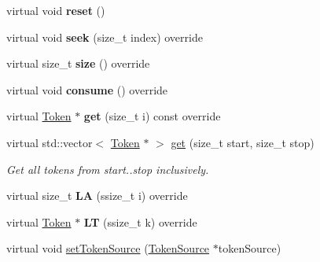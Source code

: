 \begin{DoxyCompactItemize}
virtual void {\bfseries reset} ()
\item 
\mbox{\label{classantlr4_1_1BufferedTokenStream_a96d113899cac110b51147147d9cb7b7a}} 
virtual void {\bfseries seek} (size\+\_\+t index) override
\item 
\mbox{\label{classantlr4_1_1BufferedTokenStream_abacc9f5776ad27c0dde09daea4930952}} 
virtual size\+\_\+t {\bfseries size} () override
\item 
\mbox{\label{classantlr4_1_1BufferedTokenStream_a23f513618817ff1a02f4bd5f8bad57c7}} 
virtual void {\bfseries consume} () override
\item 
\mbox{\label{classantlr4_1_1BufferedTokenStream_a409b9b2413d354d3e675f0e19ca80179}} 
virtual \hyperlink{classantlr4_1_1Token}{Token} $\ast$ {\bfseries get} (size\+\_\+t i) const override
\item 
\mbox{\label{classantlr4_1_1BufferedTokenStream_a9afaa76373aa65443db2f7d8c60a723c}} 
virtual std\+::vector$<$ \hyperlink{classantlr4_1_1Token}{Token} $\ast$ $>$ \hyperlink{classantlr4_1_1BufferedTokenStream_a9afaa76373aa65443db2f7d8c60a723c}{get} (size\+\_\+t start, size\+\_\+t stop)
\begin{DoxyCompactList}\small\item\em Get all tokens from start..stop inclusively. \end{DoxyCompactList}\item 
\mbox{\label{classantlr4_1_1BufferedTokenStream_ac13d29ad96e08c0da1f0474faa035520}} 
virtual size\+\_\+t {\bfseries LA} (ssize\+\_\+t i) override
\item 
\mbox{\label{classantlr4_1_1BufferedTokenStream_a6f373d718e438523a5779941b96d7c01}} 
virtual \hyperlink{classantlr4_1_1Token}{Token} $\ast$ {\bfseries LT} (ssize\+\_\+t k) override
\item 
\mbox{\label{classantlr4_1_1BufferedTokenStream_a3286f252ebc773cd6f4c1bd375e1012a}} 
virtual void \hyperlink{classantlr4_1_1BufferedTokenStream_a3286f252ebc773cd6f4c1bd375e1012a}{set\+Token\+Source} (\hyperlink{classantlr4_1_1TokenSource}{Token\+Source} $\ast$token\+Source)

\end{DoxyCompactItemize}
